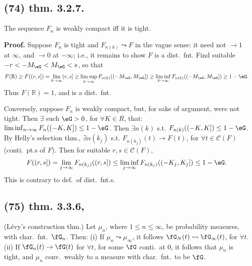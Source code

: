 \documentclass[12pt]{article}
\newcommand{\oo}\infty%
\newcommand{\Ev}\forall%
\newcommand{\Ex}\exists%
\newcommand{\BF}[1]{ \mathbb{#1} }%
\newcommand{\CF}[1]{ \mathcal{#1} }%
\newcommand{\Ss}[1]{\textsf{\bfseries{#1}}}%
\newcommand{\EqGo}[1]{ \begin{gather*}{#1}\end{gather*} } %
\begin{document}
\subsection*{(74) thm. 3.2.7.} The sequence \(F_n\) is weakly compact iff it is tight. \par
\Ss{Proof.} Suppose \(F_n\) is tight and \(F_{n(k)} \leadsto F\) in the vague sense: it need not \(\to 1\) at \(\oo\), and \(\to 0\) at \(-\oo\); i.e., it remains to show \(F\) is a dist.\ fnt. 
Find suitable \(-r <-M_\eG <M_\eG <s\), so that \EqGo{
 F(\BF{R}) 
 \geq F((r,s])
 = \lim_{k \to \oo} (r,s]
 \geq \limsup_{k \to \oo} F_{n(k)}((-M_\eG, M_\eG]) 
 \geq \liminf_{k \to \oo} F_{n(k)}((-M_\eG, M_\eG]) 
 \geq 1 -\eG. 
} Thus \(F(\BF{R}) =1\), and is a dist.\ fnt. \par
Conversely, suppose \(F_n\) is weakly compact, but, for sake of argument, were not tight. 
Then \(\Ex\) such \(\eG >0\), for \(\Ev K \in R\), that: \(\liminf_{n \to \oo} F_n((-K,K]) \leq 1 -\eG\). 
Then \(\Ex n(k)\) s.t. \(F_{n(k)}((-K,K]) \leq 1 -\eG\). 
By Helly's selection thm., \(\Ex n(k_j)\) s.t. \(F_{n(k_j)}(t) \to F(t)\), for \(\Ev t \in \CF{C}(F)\) (conti.\ pt.s of \(F\)). 
Then for suitable \(r,s \in \CF{C}(F)\), \EqGo{
 F((r,s])
 =\lim_{j \to \oo} F_{n(k_j)}((r,s])
 \leq \liminf_{j \to \oo} F_{n(k_j)}((-K_j,K_j])
 \leq 1 -\eG. 
} This is contrary to def.\ of dist.\ fnt.s. 

\subsection*{(75) thm. 3.3.6,} (L\'evy's construction thm.) 
Let \(\mu_n\), where \(1 \leq n \leq \oo\), be probability measures, with char.\ fnt.\ \(\fG_n\). Then: 
(i) If \(\mu_n \leadsto \mu_\oo\), it follows \(\fG_N(t) \leadsto \fG_\oo(t)\), for \(\Ev t\). 
(ii) If \(\fG_n(t) \to \fG(t)\) for \(\Ev t\), for some \(\fG\) conti.\ at 0, 
it follows that \(\mu_n\) is tight, and \(\mu_n\) conv.\ weakly to a measure with char.\ fnt.\ to be \(\fG\). \par
\end{document}
